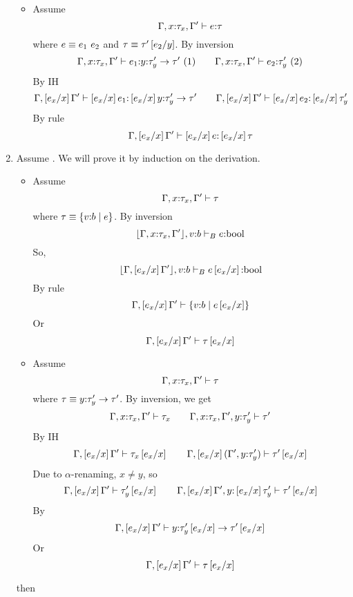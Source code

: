 \begin{enumerate}
\begin{itemize}
\item\rtapp
Assume
	$$\hastype{\Gamma, x\colon\tau_x, \Gamma'}{e}{\tau}$$
where $e\equiv\eapp{e_1}{e_2}$ and $\tau\equiv\tau'\sub{y}{e_2}$.
By inversion
	$$
	\hastype{\Gamma, x\colon\tau_x, \Gamma'}{e_1}{\tfun{y}{\tau'_y}{\tau'}}\ (1)\qquad
	\hastype{\Gamma, x\colon\tau_x, \Gamma'}{e_2}{{\tau'_y}}\ (2)
	$$
By IH 
	$$
	\hastype{\Gamma,\sub{x}{e_x} \Gamma'}{\sub{x}{e_x}e_1}{\sub{x}{e_x}\tfun{y}{\tau'_y}{\tau'}} \qquad
	\hastype{\Gamma,\sub{x}{e_x} \Gamma'}{\sub{x}{e_x}e_2}{\sub{x}{e_x}{\tau'_y}}
	$$
	By rule \rtapp
	$$
	\hastype{\Gamma,\sub{x}{e_x} \Gamma'}{\sub{x}{e_x}e}{\sub{x}{e_x}\tau}
	$$
\end{itemize}
\item \label{proof:sub:wf}
Assume .
We will prove it by induction on the derivation.
\begin{itemize}
\item \rwbase
Assume 
$$\iswellformed{\Gamma, x\colon\tau_x, \Gamma'}{\tau}$$
where $\tau\equiv\tref{v}{b}{e}$.
By inversion
$$\hastypebase{\erase{\Gamma, x\colon\tau_x, \Gamma'},v\colon b}{e}{\tbool}$$
So,
$$\hastypebase{\erase{\Gamma, \sub{x}{e_x}\Gamma'},v\colon b}{e\sub{x}{e_x}}{\tbool}$$
By rule \rwbase
$$\iswellformed{\Gamma, \sub{x}{e_x}\Gamma'}{\tref{v}{b}{e\sub{x}{e_x}}}$$
Or 
$$\iswellformed{\Gamma, \sub{x}{e_x}\Gamma'}{\tau\sub{x}{e_x}}$$
\item \rwfun
Assume
$$\iswellformed{\Gamma, x\colon\tau_x, \Gamma'}{\tau}$$
where $\tau\equiv \tfun{y}{\tau'_y}{\tau'}$.
By inversion, we get
$$
	\iswellformed{\Gamma, x\colon\tau_x, \Gamma'}{\tau_x} \qquad
	\iswellformed{\Gamma, x\colon\tau_x, \Gamma', y \colon \tau'_y}{\tau'}
$$
By IH
$$
	\iswellformed{\Gamma, \sub{x}{e_x} \Gamma'}{\tau_x\sub{x}{e_x}}\qquad
	\iswellformed{\Gamma, \sub{x}{e_x}(\Gamma', y \colon \tau'_y)}{\tau'\sub{x}{e_x}}
$$
Due to $\alpha$-renaming, $x \neq y$, so
$$
	\iswellformed{\Gamma, \sub{x}{e_x} \Gamma'}{\tau'_y\sub{x}{e_x}}\qquad
	\iswellformed{\Gamma, \sub{x}{e_x}\Gamma', y \colon \sub{x}{e_x}\tau'_y}{\tau'\sub{x}{e_x}}
$$
By \rwfun
$$
	\iswellformed{\Gamma, \sub{x}{e_x} \Gamma'}{\tfun{y}{\tau'_y\sub{x}{e_x}}{\tau'\sub{x}{e_x}}}
$$
Or
$$
	\iswellformed{\Gamma, \sub{x}{e_x} \Gamma'}{\tau\sub{x}{e_x}}
$$
\end{itemize}

	then
\end{enumerate}
